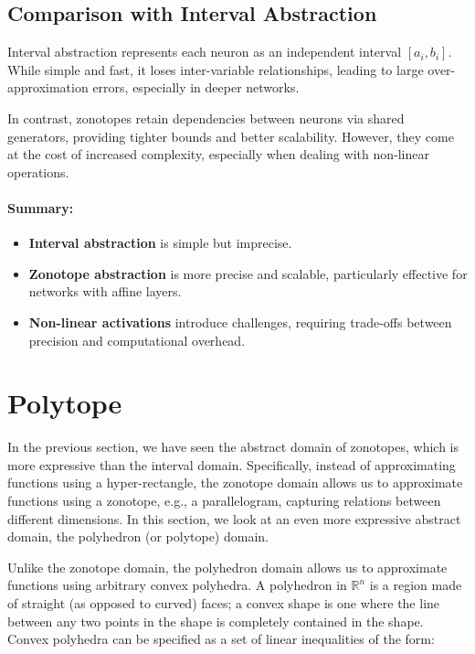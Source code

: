 \documentclass[oneside,11pt,dvipsnames]{book}
\numberwithin{equation}{section}
\theoremstyle{definition}
\theoremstyle{remark}
\begin{document}
\subsection{Comparison with Interval Abstraction}

Interval abstraction represents each neuron as an independent interval \([a_i, b_i]\). While simple and fast, it loses inter-variable relationships, leading to large over-approximation errors, especially in deeper networks.

In contrast, zonotopes retain dependencies between neurons via shared generators, providing tighter bounds and better scalability. However, they come at the cost of increased complexity, especially when dealing with non-linear operations.

\paragraph{Summary:}
\begin{itemize}
    \item \textbf{Interval abstraction} is simple but imprecise.
    \item \textbf{Zonotope abstraction} is more precise and scalable, particularly effective for networks with affine layers.
    \item \textbf{Non-linear activations} introduce challenges, requiring trade-offs between precision and computational overhead.
\end{itemize}



\section{Polytope}

In the previous section, we have seen the abstract domain of zonotopes, which is more expressive than the interval domain. Specifically, instead of approximating functions using a hyper-rectangle, the zonotope domain allows us to approximate functions using a zonotope, e.g., a parallelogram, capturing relations between different dimensions. In this section, we look at an even more expressive abstract domain, the polyhedron (or polytope) domain. 

Unlike the zonotope domain, the polyhedron domain allows us to approximate functions using arbitrary convex polyhedra. A polyhedron in \(\mathbb{R}^n\) is a region made of straight (as opposed to curved) faces; a convex shape is one where the line between any two points in the shape is completely contained in the shape. Convex polyhedra can be specified as a set of linear inequalities of the form:
\end{document}
